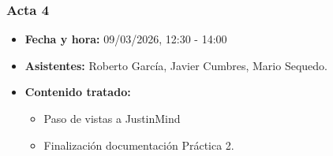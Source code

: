 \documentclass[12pt,a4paper]{article}
\begin{document}
\subsubsection{Acta 4}
\begin{itemize}
    \item \textbf{Fecha y hora: } 09/03/2026, 12:30 - 14:00
    \item \textbf{Asistentes: } Roberto García, Javier Cumbres, Mario Sequedo.
    \item \textbf{Contenido tratado: }
    \begin{itemize}
        \item [\tiny$\blacksquare$] Paso de vistas a JustinMind
        \item [\tiny$\blacksquare$] Finalización documentación Práctica 2.
    \end{itemize}
\end{itemize}
\end{document}
